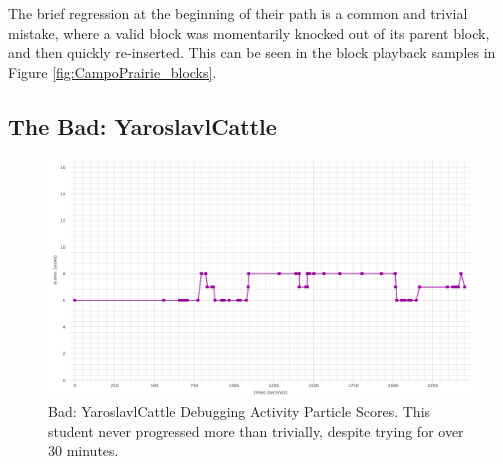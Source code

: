 The brief regression at the beginning of their path is a common and trivial mistake, where a valid block was momentarily knocked out of its parent block, and then quickly re-inserted. This can be seen in the block playback samples in Figure \ref{fig:CampoPrairie_blocks}.


\subsection{The Bad: YaroslavlCattle}
\begin{figure}
	\centering
	\includegraphics[width=\textwidth]{images/stories/scores-debug-YaroslavlCattle}
	\caption[Bad: YaroslavlCattle Debugging Activity Particle Scores]{Bad: YaroslavlCattle Debugging Activity Particle Scores. This student never progressed more than trivially, despite trying for over 30 minutes.}
	\label{fig:YaroslavlCattle_chart}
\end{figure}

